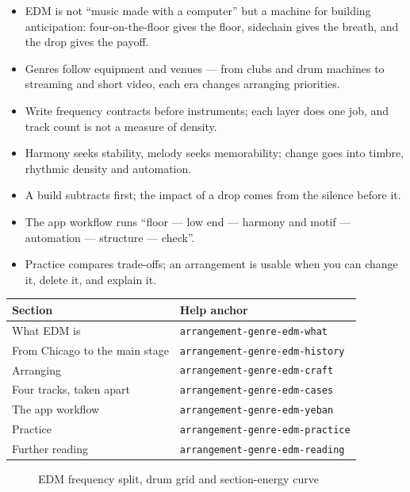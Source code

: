 \begin{itemize}
\item EDM is not ``music made with a computer'' but a machine for building anticipation: four-on-the-floor gives the floor, sidechain gives the breath, and the drop gives the payoff.
\item Genres follow equipment and venues --- from clubs and drum machines to streaming and short video, each era changes arranging priorities.
\item Write frequency contracts before instruments; each layer does one job, and track count is not a measure of density.
\item Harmony seeks stability, melody seeks memorability; change goes into timbre, rhythmic density and automation.
\item A build subtracts first; the impact of a drop comes from the silence before it.
\item The app workflow runs ``floor --- low end --- harmony and motif --- automation --- structure --- check''.
\item Practice compares trade-offs; an arrangement is usable when you can change it, delete it, and explain it.
\end{itemize}

\begin{helpmapping}
\begin{longtable}{p{}p{}}
\toprule
Section & Help anchor \\
\midrule
What EDM is & \texttt{arrangement-genre-edm-what} \\
From Chicago to the main stage & \texttt{arrangement-genre-edm-history} \\
Arranging & \texttt{arrangement-genre-edm-craft} \\
Four tracks, taken apart & \texttt{arrangement-genre-edm-cases} \\
The app workflow & \texttt{arrangement-genre-edm-yeban} \\
Practice & \texttt{arrangement-genre-edm-practice} \\
Further reading & \texttt{arrangement-genre-edm-reading} \\
\bottomrule
\end{longtable}
\end{helpmapping}

\begin{figure}[htbp]\centering
{}
\caption{EDM frequency split, drum grid and section-energy curve}
\end{figure}
